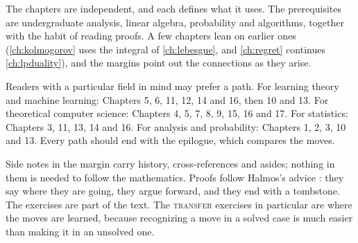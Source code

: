 \begin{refsection}

The chapters are independent, and each defines what it uses. The prerequisites are undergraduate analysis, linear algebra, probability and algorithms, together with the habit of reading proofs. A few chapters lean on earlier ones (\cref{ch:kolmogorov} uses the integral of \cref{ch:lebesgue}, and \cref{ch:regret} continues \cref{ch:lpduality}), and the margins point out the connections as they arise.

Readers with a particular field in mind may prefer a path. For learning theory and machine learning: Chapters 5, 6, 11, 12, 14 and 16, then 10 and 13. For theoretical computer science: Chapters 4, 5, 7, 8, 9, 15, 16 and 17. For statistics: Chapters 3, 11, 13, 14 and 16. For analysis and probability: Chapters 1, 2, 3, 10 and 13. Every path should end with the epilogue, which compares the moves.

Side notes in the margin carry history, cross-references and asides; nothing in them is needed to follow the mathematics. Proofs follow Halmos's advice \parencite{Halmos1970}: they say where they are going, they argue forward, and they end with a tombstone. The exercises are part of the text. The \textsc{transfer} exercises in particular are where the moves are learned, because recognizing a move in a solved case is much easier than making it in an unsolved one.


\end{refsection}
